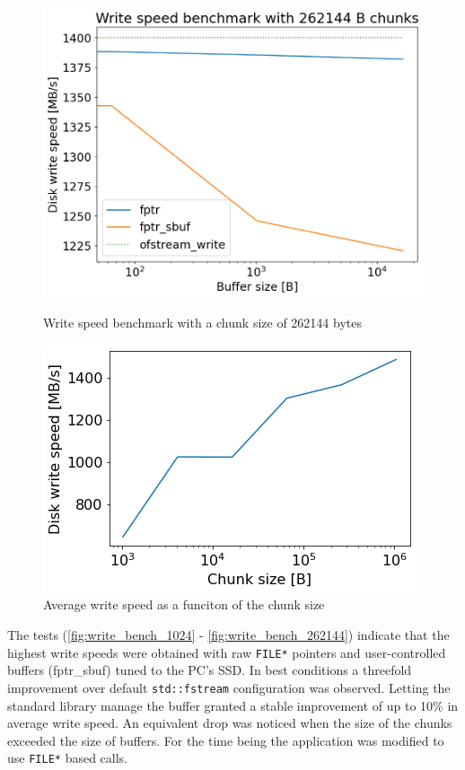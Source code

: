   \begin{figure}[H]
    \centering
    \begin{minipage}{.45\textwidth}
      \centering
      \includegraphics[width=\linewidth]{media/write_bench_262144.png}
      \caption{Write speed benchmark with a chunk size of 262144 bytes}
      \label{fig:write_bench_262144}
    \end{minipage}%
    \hfill
    \begin{minipage}{.45\textwidth}
      \centering
      \includegraphics[width=\linewidth]{media/chunk_bench.png}
      \caption{Average write speed as a funciton of the chunk size}
      \label{fig:chunk_bench}
    \end{minipage}
  \end{figure}


The tests (\autoref{fig:write_bench_1024} - \autoref{fig:write_bench_262144})
indicate that the highest write speeds were obtained with
raw \lstinline{FILE*} pointers and user-controlled buffers (fptr\_sbuf) tuned
to the PC's SSD. In best conditions a threefold improvement
over default \lstinline{std::fstream} configuration was observed.
Letting the standard library manage the buffer
granted a stable improvement of up to 10\% in average write speed.
An equivalent drop was noticed when the size of the
chunks exceeded the size of buffers. For the time being the application 
was modified to use \lstinline{FILE*} based calls.

